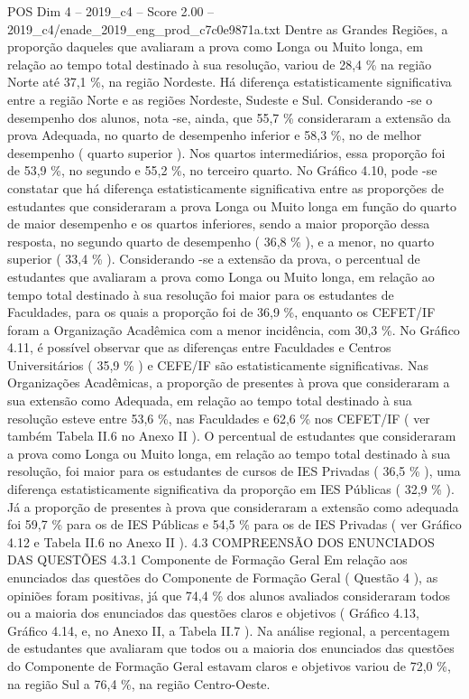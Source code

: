 \begin{textsample}{POS Dim 4 – 2019\_c4 – Score 2.00 – 2019\_c4/enade\_2019\_eng\_prod\_c7c0e9871a.txt}
Dentre as Grandes Regiões, a proporção daqueles que avaliaram a prova como Longa ou Muito longa, em relação ao tempo total destinado à sua resolução, variou de 28,4 \% na região Norte até 37,1 \%, na região Nordeste.
Há diferença estatisticamente significativa entre a região Norte e as regiões Nordeste, Sudeste e Sul.
Considerando -se o desempenho dos alunos, nota -se, ainda, que 55,7 \% consideraram a extensão da prova Adequada, no quarto de desempenho inferior e 58,3 \%, no de melhor desempenho ( quarto superior ).
Nos quartos intermediários, essa proporção foi de 53,9 \%, no segundo e 55,2 \%, no terceiro quarto.
No Gráfico 4.10, pode -se constatar que há diferença estatisticamente significativa entre as proporções de estudantes que consideraram a prova Longa ou Muito longa em função do quarto de maior desempenho e os quartos inferiores, sendo a maior proporção dessa resposta, no segundo quarto de desempenho ( 36,8 \% ), e a menor, no quarto superior ( 33,4 \% ).
Considerando -se a extensão da prova, o percentual de estudantes que avaliaram a prova como Longa ou Muito longa, em relação ao tempo total destinado à sua resolução foi maior para os estudantes de Faculdades, para os quais a proporção foi de 36,9 \%, enquanto os CEFET/IF foram a Organização Acadêmica com a menor incidência, com 30,3 \%.
No Gráfico 4.11, é possível observar que as diferenças entre Faculdades e Centros Universitários ( 35,9 \% ) e CEFE/IF são estatisticamente significativas.
Nas Organizações Acadêmicas, a proporção de presentes à prova que consideraram a sua extensão como Adequada, em relação ao tempo total destinado à sua resolução esteve entre 53,6 \%, nas Faculdades e 62,6 \% nos CEFET/IF ( ver também Tabela II.6 no Anexo II ).
O percentual de estudantes que consideraram a prova como Longa ou Muito longa, em relação ao tempo total destinado à sua resolução, foi maior para os estudantes de cursos de IES Privadas ( 36,5 \% ), uma diferença estatisticamente significativa da proporção em IES Públicas ( 32,9 \% ).
Já a proporção de presentes à prova que consideraram a extensão como adequada foi 59,7 \% para os de IES Públicas e 54,5 \% para os de IES Privadas ( ver Gráfico 4.12 e Tabela II.6 no Anexo II ). 4.3 COMPREENSÃO DOS ENUNCIADOS DAS QUESTÕES 4.3.1 Componente de Formação Geral Em relação aos enunciados das questões do Componente de Formação Geral ( Questão 4 ), as opiniões foram positivas, já que 74,4 \% dos alunos avaliados consideraram todos ou a maioria dos enunciados das questões claros e objetivos ( Gráfico 4.13, Gráfico 4.14, e, no Anexo II, a Tabela II.7 ).
Na análise regional, a percentagem de estudantes que avaliaram que todos ou a maioria dos enunciados das questões do Componente de Formação Geral estavam claros e objetivos variou de 72,0 \%, na região Sul a 76,4 \%, na região Centro-Oeste.

\end{textsample}

